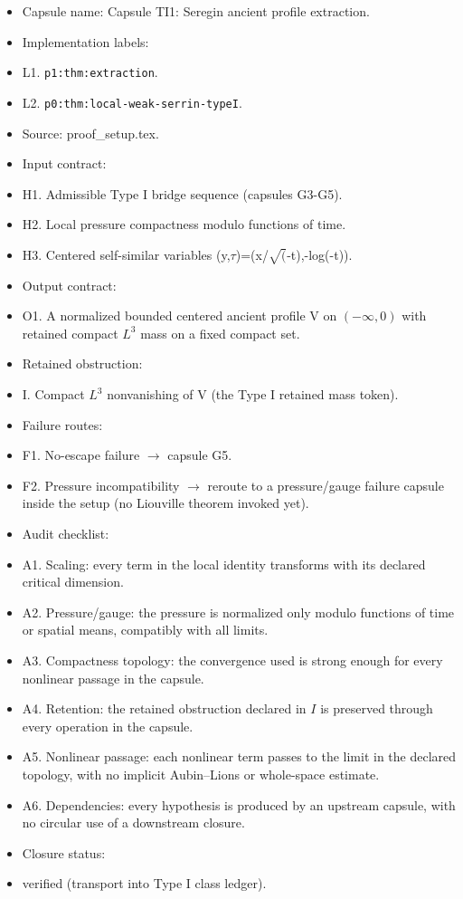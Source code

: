 \documentclass[11pt]{amsart}
\begin{document}
\begin{itemize}
  \item Capsule name: Capsule TI1: Seregin ancient profile extraction.
  \item Implementation labels:
  \item L1. \texttt{p1:thm:extraction}.
  \item L2. \texttt{p0:thm:local-weak-serrin-typeI}.
  \item Source: proof\_setup.tex.
  \item Input contract:
  \item H1. Admissible Type I bridge sequence (capsules G3-G5).
  \item H2. Local pressure compactness modulo functions of time.
  \item H3. Centered self-similar variables (y,$\tau$)=(x/$\sqrt($-t),-log(-t)).
  \item Output contract:
  \item O1. A normalized bounded centered ancient profile V on $(-\infty,0)$ with retained compact $L^3$ mass on a fixed compact set.
  \item Retained obstruction:
  \item I. Compact $L^3$ nonvanishing of V (the Type I retained mass token).
  \item Failure routes:
  \item F1. No-escape failure $\to$ capsule G5.
  \item F2. Pressure incompatibility $\to$ reroute to a pressure/gauge failure capsule inside the setup (no Liouville theorem invoked yet).
  \item Audit checklist:
  \item A1. Scaling: every term in the local identity transforms with its declared critical dimension.
  \item A2. Pressure/gauge: the pressure is normalized only modulo functions of time or spatial means, compatibly with all limits.
  \item A3. Compactness topology: the convergence used is strong enough for every nonlinear passage in the capsule.
  \item A4. Retention: the retained obstruction declared in $I$ is preserved through every operation in the capsule.
  \item A5. Nonlinear passage: each nonlinear term passes to the limit in the declared topology, with no implicit Aubin--Lions or whole-space estimate.
  \item A6. Dependencies: every hypothesis is produced by an upstream capsule, with no circular use of a downstream closure.
  \item Closure status:
  \item verified (transport into Type I class ledger).
\end{itemize}
\end{document}
